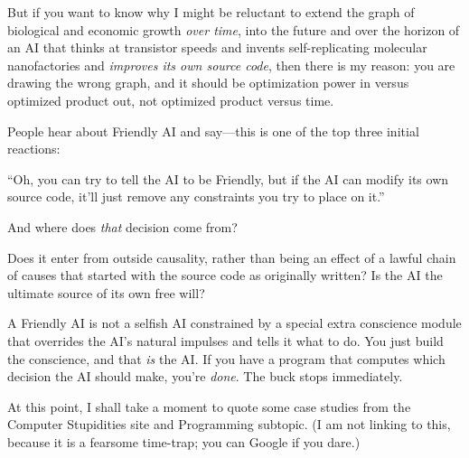  But if you want to know why I might be reluctant to extend the
graph of biological and economic growth \textit{over time}, into the
future and over the horizon of an AI that thinks at transistor speeds
and invents self-replicating molecular nanofactories and
\textit{improves its own source code}, then there is my reason: you are
drawing the wrong graph, and it should be optimization power in versus
optimized product out, not optimized product versus time.

\myendsectiontext



 People hear about Friendly AI and say---this is one of the top
three initial reactions: 


 ``Oh, you can try to tell the AI to be Friendly,
but if the AI can modify its own source code, it'll
just remove any constraints you try to place on
it.''


 And where does \textit{that} decision come from?


 Does it enter from outside causality, rather than being an effect
of a lawful chain of causes that started with the source code as
originally written? Is the AI the ultimate source of its own free
will?


 A Friendly AI is not a selfish AI constrained by a special extra
conscience module that overrides the AI's natural
impulses and tells it what to do. You just build the conscience, and
that \textit{is} the AI. If you have a program that computes which
decision the AI should make, you're \textit{done}. The
buck stops immediately.


 At this point, I shall take a moment to quote some case studies
from the Computer Stupidities site and Programming subtopic. (I am not
linking to this, because it is a fearsome time-trap; you can Google if
you dare.)


